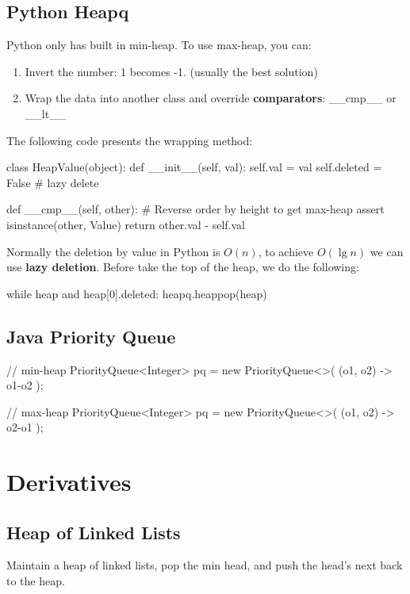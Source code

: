 \subsection{Python Heapq}
Python only has built in min-heap. To use max-heap, you can: 
\begin{enumerate}
\item Invert the number: 1 becomes -1.
(usually the best solution)\item Wrap the data into another class and override \textbf{comparators}: \_\_cmp\_\_ or \_\_lt\_\_
\end{enumerate}

The following code presents the wrapping method:
\begin{python}
class HeapValue(object):
    def __init__(self, val):
        self.val = val
        self.deleted = False  # lazy delete 

    def __cmp__(self, other):
        # Reverse order by height to get max-heap
        assert isinstance(other, Value)
        return other.val - self.val
\end{python}

Normally the deletion by value in Python is $O(n)$, to achieve $O(\lg n)$ we can use \textbf{lazy deletion}. Before take the top of the heap, we do the following:
\begin{python}
while heap and heap[0].deleted:
    heapq.heappop(heap)
\end{python}
\subsection{Java Priority Queue}
\begin{java}
// min-heap
PriorityQueue<Integer> pq = new PriorityQueue<>(
    (o1, o2) -> o1-o2
);

// max-heap
PriorityQueue<Integer> pq = new PriorityQueue<>(
    (o1, o2) -> o2-o1
);
\end{java}

\section{Derivatives}
\subsection{Heap of Linked Lists}
Maintain a heap of linked lists, pop the min head, and push the head's next back to the heap. 

